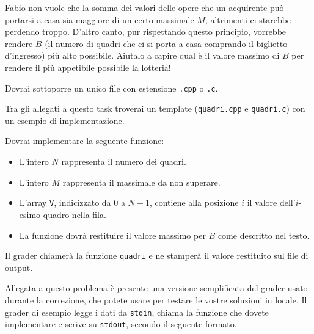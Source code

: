 Fabio non vuole che la somma dei valori delle opere che un acquirente può portarsi a casa sia maggiore di un certo massimale $M$, altrimenti ci starebbe perdendo troppo. D'altro canto, pur rispettando questo principio, vorrebbe rendere $B$ (il numero di quadri che ci si porta a casa comprando il biglietto d'ingresso) più alto possibile. Aiutalo a capire qual è il valore massimo di $B$ per rendere il più appetibile possibile la lotteria!

\Implementation

Dovrai sottoporre un unico file con estensione \texttt{.cpp} o \texttt{.c}.

\begin{warning}
Tra gli allegati a questo task troverai un template (\texttt{quadri.cpp} e \texttt{quadri.c}) con un esempio di implementazione.
\end{warning}

\pagebreak

Dovrai implementare la seguente funzione:

\begin{itemize}[nolistsep]

    \begin{itemize}[nolistsep]
        \item L'intero $N$ rappresenta il numero dei quadri.
        \item L'intero $M$ rappresenta il massimale da non superare.
        \item L'array \texttt{V}, indicizzato da $0$ a $N-1$, contiene alla posizione $i$ il valore dell'$i$-esimo quadro nella fila.
        \item La funzione dovrà restituire il valore massimo per $B$ come descritto nel testo.

    \end{itemize}
\end{itemize}

Il grader chiamerà la funzione \texttt{quadri} e ne stamperà il valore restituito sul file di output.



\Grader
Allegata a questo problema è presente una versione semplificata del grader usato durante la correzione, che potete usare per testare le vostre soluzioni in locale. Il grader di esempio legge i dati da \texttt{stdin}, chiama la funzione che dovete implementare e scrive su \texttt{stdout}, secondo il seguente formato.

